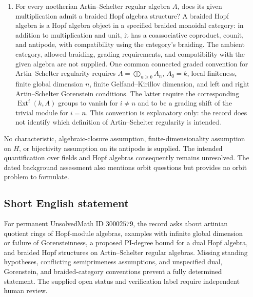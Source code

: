 \documentclass[11pt]{article}
\begin{document}
\begin{enumerate}
\item For every noetherian Artin--Schelter regular algebra \(A\), does its given multiplication admit a braided Hopf algebra structure? A braided Hopf algebra is a Hopf algebra object in a specified braided monoidal category: in addition to multiplication and unit, it has a coassociative coproduct, counit, and antipode, with compatibility using the category's braiding. The ambient category, allowed braiding, grading requirements, and compatibility with the given algebra are not supplied. One common connected graded convention for Artin--Schelter regularity requires \(A=\bigoplus_{n\ge0}A_n\), \(A_0=k\), local finiteness, finite global dimension \(n\), finite Gelfand--Kirillov dimension, and left and right Artin--Schelter Gorenstein conditions. The latter require the corresponding \(\operatorname{Ext}^i(k,A)\) groups to vanish for \(i\ne n\) and to be a grading shift of the trivial module for \(i=n\). This convention is explanatory only: the record does not identify which definition of Artin--Schelter regularity is intended.
\end{enumerate}

No characteristic, algebraic-closure assumption, finite-dimensionality assumption on \(H\), or bijectivity assumption on its antipode is supplied. The intended quantification over fields and Hopf algebras consequently remains unresolved. The dated background assessment also mentions orbit questions but provides no orbit problem to formulate.
\subsection{Short English statement}
For permanent UnsolvedMath ID \(30002579\), the record asks about artinian quotient rings of Hopf-module algebras, examples with infinite global dimension or failure of Gorensteinness, a proposed PI-degree bound for a dual Hopf algebra, and braided Hopf structures on Artin--Schelter regular algebras. Missing standing hypotheses, conflicting semiprimeness assumptions, and unspecified dual, Gorenstein, and braided-category conventions prevent a fully determined statement. The supplied open status and verification label require independent human review.
\end{document}
